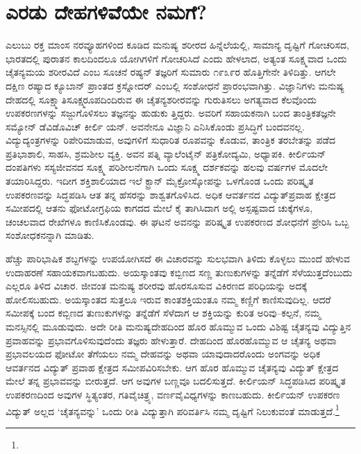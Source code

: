 \section{ಎರಡು ದೇಹಗಳಿವೆಯೇ ನಮಗೆ?}

ಎಲುಬು ರಕ್ತ ಮಾಂಸ ನರವ್ಯೂಹಗಳಿಂದ ಕೂಡಿದ ಮನುಷ್ಯ ಶರೀರದ ಹಿನ್ನೆಲೆಯಲ್ಲಿ, ಸಾಮಾನ್ಯ ದೃಷ್ಟಿಗೆ ಗೋಚರಿಸದ, ಭಾರತದಲ್ಲಿ ಪುರಾತನ ಕಾಲದಿಂದಲೂ ಯೋಗಿಗಳಿಗೆ ಗೋಚರಿಸಿದೆ ಎಂದು ಹೇಳಲಾದ, ಅತ್ಯಂತ ಸೂಕ್ಷ್ಮವಾದ ಒಂದು ಚೈತನ್ಯಮಯ ಶರೀರವಿದೆ ಎಂಬ ಸೂಚನೆ ರಷ್ಯನ್ ತಜ್ಞರಿಗೆ ಸುಮಾರು ೧೯೩೯ರ ಹೊತ್ತಿಗೇನೇ ತಿಳಿದಿತ್ತು. ಆಗಲೇ ದಕ್ಷಿಣ ರಷ್ಯಾದ ಕ್ಯೂಬಾನ್ ಪ್ರಾಂತದ ಕ್ರಸ್ನೋದರ್ ಎಂಬಲ್ಲಿ ಸಂಶೋಧನೆ ಪ್ರಾರಂಭವಾಗಿತ್ತು. ವಿಜ್ಞಾನಿಗಳು ಮನುಷ್ಯ ದೇಹದಲ್ಲಿ ಸೂಕ್ಷ್ಮಾತಿಸೂಕ್ಷ್ಮರೂಪದಿಂದಿರುವ ಈ ಚೈತನ್ಯಶರೀರವನ್ನು ಗುರುತಿಸಲು ಅಗತ್ಯವಾದ ಕೆಲವೊಂದು ಉಪಕರಣಗಳನ್ನು ಸಜ್ಜುಗೊಳಿಸಲು ತಜ್ಞನನ್ನು ಹುಡುಕು ತ್ತಿದ್ದರು. ಅವರಿಗೆ ಸಹಾಯಕನಾಗಿ ಬಂದ ತಾಂತ್ರಿಕತಜ್ಞನೇ ಸಮ್ಯೋನ್ ಡೆವಿಡೊವಿಚ್ ಕೀರ್ಲಿ ಯನ್. ಅವನೇನೂ ವಿಜ್ಞಾನಿ ಎನಿಸಿಕೊಂಡು ಪ್ರಸಿದ್ಧಿಗೆ ಬಂದವನಲ್ಲ. ವಿದ್ಯುದ್ಯಂತ್ರಗಳನ್ನು ರಿಪೇರಿಮಾಡುವ, ಅವುಗಳಿಗೆ ಸುಧಾರಿತ ರೂಪವನ್ನು ಕೊಡುವ, ತಾಂತ್ರಿಕ ತರಬೇತನ್ನು ಪಡೆದ ಪ್ರತಿಭಾಶಾಲಿ, ಸಾಹಸಿ, ಶ್ರಮಶೀಲ ವ್ಯಕ್ತಿ. ಅವನ ಪತ್ನಿ ವ್ಯಾಲೆಂಟೈನ್ ಪತ್ರಿಕೋದ್ಯಮಿ, ಅಧ್ಯಾಪಕಿ. ಕೀರ್ಲಿಯನ್ ದಂಪತಿಗಳು ಸಸ್ಯಜೀವನದ ಸೂಕ್ಷ್ಮ ಪರಿಶೀಲನೆಗಾಗಿ ಒಂದು ಸೂಕ್ಷ್ಮ ದರ್ಶಕವನ್ನು ಹಲವು ವರ್ಷಗಳ ಮೊದಲೇ ತಯಾರಿಸಿದ್ದರು. ಇದೀಗ ಶಕ್ತಿಶಾಲಿಯಾದ ಇಲೆ ಕ್ಟ್ರಾನ್ ಮೈಕ್ರೋಸ್ಕೋಪನ್ನು ಒಳಗೊಂಡ ಒಂದು ಪರಿಷ್ಕೃತ ಉಪಕರಣವನ್ನು ಸಿದ್ಧಪಡಿಸಿ ಆತ ತನ್ನ ಹೆಸರನ್ನು ಶಾಶ್ವತಗೊಳಿಸಿದ. ಅಧಿಕ ಆವರ್ತನದ ವಿದ್ಯುತ್​ಪ್ರವಾಹ ಕ್ಷೇತ್ರದ ಸಮೀಪದಲ್ಲಿ ಆತನು ಫೋಟೋಗ್ರಫಿಯ ಕಾಗದದ ಮೇಲೆ ಕೈ ತಾಗಿಸಿದಾಗ ಅಲ್ಲಿ ಅಸ್ಪಷ್ಟವಾದ ಚುಕ್ಕೆಗಳೂ, ಚಂಚಲವಾದ ರೇಖೆಗಳೂ ಕಾಣಿಸಿಕೊಂಡವು. ಈ ಘಟನೆ ಅವನನ್ನು ಪರಿಷ್ಕೃತ ಉಪಕರಣದ ಶೋಧನೆಗೆ ಪ್ರೇರಿಸಿ ಒಬ್ಬ ಸಂಶೋಧಕನನ್ನಾಗಿ ಮಾಡಿತು.

ಹೆಚ್ಚು ಪಾರಿಭಾಷಿಕ ಶಬ್ದಗಳನ್ನು ಉಪಯೋಗಿಸದೆ ಈ ವಿಚಾರವನ್ನು ಸುಲಭವಾಗಿ ತಿಳಿದು ಕೊಳ್ಳಲು ಮುಂದೆ ಹೇಳುವ ಉದಾಹರಣೆ ಸಹಾಯಕವಾಗಬಹುದು. ಅಯಸ್ಕಾಂತವು ಕಬ್ಬಿಣದ ಸಣ್ಣ ತುಣುಕುಗಳನ್ನು ತನ್ನೆಡೆಗೆ ಸೆಳೆಯುತ್ತದೆಂಬುದು ಎಲ್ಲರೂ ತಿಳಿದ ವಿಚಾರ. ಜೀವಂತ ಮನುಷ್ಯ ಶರೀರವು ಹೊರಸೂಸುವ ವಿಕಿರಣದ ಪರಿಧಿಯನ್ನು ಅದಕ್ಕೆ ಹೋಲಿಸಬಹುದು. ಅಯಸ್ಕಾಂತದ ಸುತ್ತಲೂ ಇರುವ ಕಾಂತಶಕ್ತಿಯಂತೂ ನಮ್ಮ ಕಣ್ಣಿಗೆ ಕಾಣಿಸುವುದಿಲ್ಲ. ಆದರೆ ಸಮೀಪಕ್ಕೆ ಬಂದ ಕಬ್ಬಿಣದ ತುಣುಕುಗಳನ್ನು ತನ್ನೆಡೆಗೆ ಸೆಳೆದಾಗ ಆ ಶಕ್ತಿಯನ್ನು ಕುರಿತ ಅರಿವು–ಕಲ್ಪನೆ, ನಮ್ಮ ಮನಸ್ಸಿನಲ್ಲಿ ಮೂಡುವುದು. ಅದೇ ರೀತಿ ಮನುಷ್ಯದೇಹದಿಂದ ಹೊರ ಹೊಮ್ಮುವ ಒಂದು ವಿಶಿಷ್ಟ ಚೈತನ್ಯವು ವಿದ್ಯುತ್ತಿನ ಪ್ರವಾಹವನ್ನು ಪ್ರಭಾವಗೊಳಿಸುವುದೆಂದು ತಜ್ಞರು ಹೇಳುತ್ತಾರೆ. ದೇಹದಿಂದ ಹೊರಹೊಮ್ಮುವ ಆ ಚೈತನ್ಯ ಅಥವಾ ಪ್ರಭಾವಲಯದ ಫೋಟೋ ತೆಗೆಯಲು ನಮ್ಮ ದೇಹವನ್ನು ಅಥವಾ ಯಾವುದಾದರೊಂದು ಅಂಗವನ್ನು ಅಧಿಕ ಆವರ್ತನದ ವಿದ್ಯುತ್ ಪ್ರವಾಹ ಕ್ಷೇತ್ರದ ಸಮೀಪವಿರಿಸಬೇಕು. ಆಗ ಹೊರ ಹೊಮ್ಮುವ ಚೈತನ್ಯವು ವಿದ್ಯುತ್ ಕ್ಷೇತ್ರದ ಮೇಲೆ ತನ್ನ ಪ್ರಭಾವವನ್ನು ಬೀರುತ್ತದೆ. ಆಗ ಅವುಗಳ ಬಣ್ಣವೂ ಬದಲಿಸುತ್ತದೆ. ಕೀರ್ಲಿಯನ್ ಸಿದ್ಧಪಡಿಸಿದ ಪರಿಷ್ಕೃತ ಉಪಕರಣದಿಂದ ಅವುಗಳ ಸ್ಥಿತ್ಯಂತರ, ಗತಿವೈಚಿತ್ರ್ಯ, ವರ್ಣವೈವಿಧ್ಯಗಳನ್ನು ಕಾಣಬಹುದು. ಕೀರ್ಲಿಯನ್ ಉಪಕರಣ ವಿದ್ಯುತ್ ಅಲ್ಲದ ‘ಚೈತನ್ಯವನ್ನು’ ಒಂದು ರೀತಿ ವಿದ್ಯುತ್ತಾಗಿ ಪರಿವರ್ತಿಸಿ ನಮ್ಮ ದೃಷ್ಟಿಗೆ ನಿಲುಕುವಂತೆ ಮಾಡುತ್ತದೆ.\footnote{}

